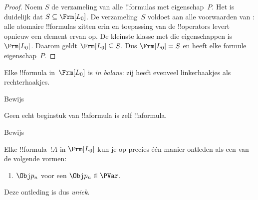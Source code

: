 \documentclass[openany]{memoir}
\begin{document}
\begin{proof}
  Noem $S$ de verzameling van alle !!{formula}s met eigenschap~$P$.
  Het is duidelijk dat $S \subseteq \Frm[L_0]$. De verzameling~$S$ voldoet
  aan alle voorwaarden van : alle atomaire
  !!{formula}s zitten erin en toepassing van de !!{operator}s levert
  opnieuw een element ervan op. De kleinste klasse met die eigenschappen
  is $\Frm[L_0]$. Daarom geldt $\Frm[L_0] \subseteq S$. Dus
  $\Frm[L_0] = S$ en heeft elke
  formule eigenschap~$P$.
\end{proof}

\begin{prop}
   Elke !!{formula} in~$\Frm[L_0]$ is \emph{in balans}: zij heeft
   evenveel linkerhaakjes als rechterhaakjes.
\end{prop}

\begin{prob}
Bewijs 
\end{prob}

\begin{prop} 
Geen echt beginstuk van !!a{formula} is zelf !!a{formula}.
\end{prop}

\begin{prob}
  Bewijs 
\end{prob}

\begin{prop}
Elke !!{formula}~$!A$ in $ \Frm[L_0]$ kun je op precies één manier
ontleden als een van de volgende vormen:
\begin{enumerate}


\item $\Obj p_n$ voor een $\Obj p_n \in  \PVar$.
  




\end{enumerate}
Deze ontleding is dus \emph{uniek}.
\end{prop}
\end{document}
